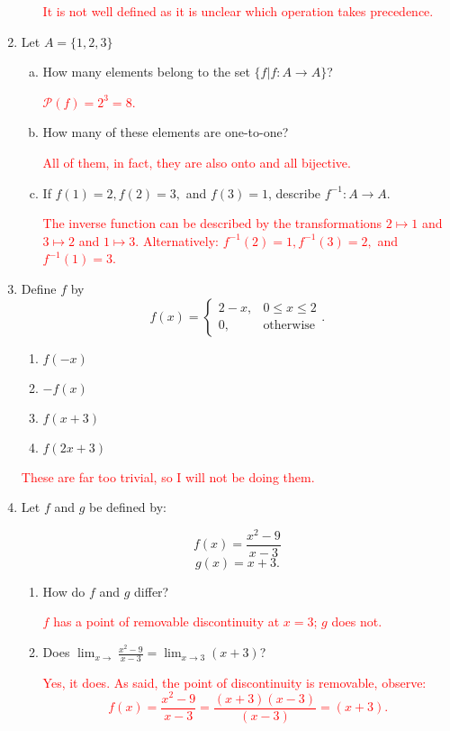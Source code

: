 \documentclass{article}
\begin{document}
\begin{enumerate}
\begin{enumerate}[(a)]
        \textcolor{red}{It is not well defined as it is unclear which operation takes precedence.}


\end{enumerate}

\item Let $A=\{1,2,3\}$
  \begin{enumerate}[(a)]
    \item How many elements belong to the set \( \{f|f:A\to A\} \)?

      \textcolor{red}{$\mathscr{P}(f)=2^3=8$.}

    \item How many of these elements are one-to-one? 

      \textcolor{red}{All of them, in fact, they are also onto and all bijective.}

    \item If $f(1)=2, f(2)=3,$ and $f(3)=1$, describe $f^{-1}:A\to A$. 

      \textcolor{red}{The inverse function can be described by the transformations $2\mapsto 1$ and $3\mapsto 2$ and $1\mapsto 3$. Alternatively: $f^{-1}(2)=1, f^{-1}(3)=2,$ and $f^{-1}(1)=3$.}

\end{enumerate}

\item Define $f$ by 
  \[
    f(x)=\begin{cases}
      2-x, & 0\leq x \leq 2 \\
      0, & \text{otherwise}
         \end{cases}
  .\] 
  \begin{enumerate}
    \item $f(-x)$


    \item $-f(x)$


    \item $f(x+3)$


    \item \( f(2x+3) \)


  \end{enumerate}

  \textcolor{red}{These are far too trivial, so I will not be doing them.}
  
\item Let \( f \) and \( g \) be defined by: 

\[
  f(x)=\frac{x^2-9}{x-3}
\] 
\[
  g(x)=x+3
.\] 
\begin{enumerate}
  \item How do $f$ and $g$ differ?
    
    \textcolor{red}{$f$ has a point of removable discontinuity at $x=3$; $g$ does not.}

  \item Does \( \lim_{x\to}\frac{x^2-9}{x-3}=\lim_{x\to 3}(x+3) \)?

    \textcolor{red}{Yes, it does. As said, the point of discontinuity is removable, observe: \[  f(x)=\frac{x^2-9}{x-3}=\frac{(x+3)(x-3)}{(x-3)}=(x+3)   .\] }
\end{enumerate}



\end{enumerate}
\end{document}
